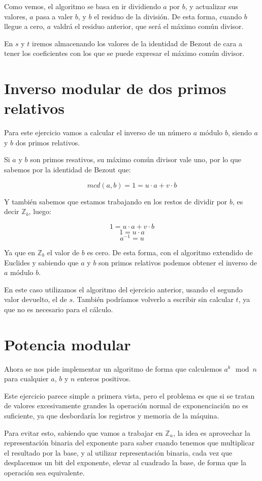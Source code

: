 \documentclass[12pt, spanish]{article}
\begin{document}
Como vemos, el algoritmo se basa en ir dividiendo $a$ por $b$, y actualizar sus valores, $a$ pasa a valer $b$, y $b$ el residuo de la división. De esta forma, cuando $b$ llegue a cero, $a$ valdrá el residuo anterior, que será el máximo común divisor.

En $s$ y $t$ iremos almacenando los valores de la identidad de Bezout de cara a tener los coeficientes con los que se puede expresar el máximo común divisor.


\section{Inverso modular de dos primos relativos}

Para este ejercicio vamos a calcular el inverso de un número $a$ módulo $b$, siendo $a$ y $b$ dos primos relativos.

Si $a$ y $b$ son primos resativos, su máximo común divisor vale uno, por lo que sabemos por la identidad de Bezout que:

$$ mcd(a, b) = 1 = u \cdot a + v \cdot b $$

Y también sabemos que estamos trabajando en los restos de dividir por $b$, es decir $\mathbb{Z}_b$, luego:

$$1 = u \cdot a + v \cdot b $$
$$1 = u \cdot a $$
$$a^{-1} = u$$

Ya que en $\mathbb{Z}_b$ el valor de $b$ es cero. De esta forma, con el algoritmo extendido de Euclides y sabiendo que $a$ y $b$ son primos relativos podemos obtener el inverso de $a$ módulo $b$.

En este caso utilizamos el algoritmo del ejercicio anterior, usando el segundo valor devuelto, el de $s$. También podríamos volverlo a escribir sin calcular $t$, ya que no es necesario para el cálculo.


\section{Potencia modular}

Ahora se nos pide implementar un algoritmo de forma que calculemos $a^b \mod n$ para cualquier $a$, $b$ y $n$ enteros positivos.

Este ejercicio parece simple a primera vista, pero el problema es que si se tratan de valores excesivamente grandes la operación normal de exponenciación no es suficiente, ya que desbordaría los registros y memoria de la máquina.

Para evitar esto, sabiendo que vamos a trabajar en $\mathbb{Z}_{n}$, la idea es aprovechar la representación binaria del exponente para saber cuando tenemos que multiplicar el resultado por la base, y al utilizar representación binaria, cada vez que desplacemos un bit del exponente, elevar al cuadrado la base, de forma que la operación sea equivalente.
\end{document}
